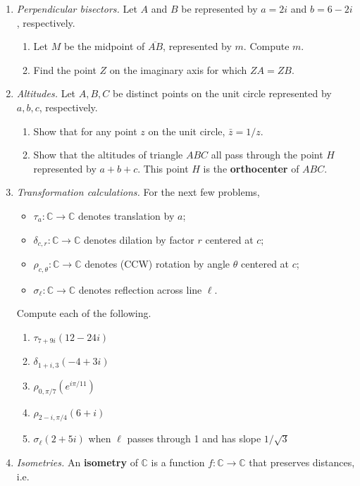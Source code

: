 \begin{enumerate}
\item \emph{Perpendicular bisectors.} Let $A$ and $B$ be represented by $a = 2i$ and $b = 6 - 2i$, respectively.
\begin{enumerate}
\item Let $M$ be the midpoint of $\overline{AB}$, represented by $m$. Compute $m$.
\item Find the point $Z$ on the imaginary axis for which $ZA = ZB$.
\end{enumerate}
\item \emph{Altitudes.} Let $A,B,C$ be distinct points on the unit circle represented by $a,b,c$, respectively.
\begin{enumerate}
\item Show that for any point $z$ on the unit circle, $\bar{z} = 1/z$.
\item Show that the altitudes of triangle $ABC$ all pass through the point $H$ represented by $a + b + c$. This point $H$ is the \textbf{orthocenter} of $ABC$.
\end{enumerate}
\item \emph{Transformation calculations.} For the next few problems,
\begin{itemize}
\item $\tau_a:\mathbb{C}\to\mathbb{C}$ denotes translation by $a$;
\item $\delta_{c,r}:\mathbb{C}\to\mathbb{C}$ denotes dilation by factor $r$ centered at $c$;
\item $\rho_{c,\theta}:\mathbb{C}\to\mathbb{C}$ denotes (CCW) rotation by angle $\theta$ centered at $c$;
\item $\sigma_{\ell}:\mathbb{C}\to\mathbb{C}$ denotes reflection across line $\ell$.
\end{itemize}
Compute each of the following.
\begin{enumerate}
\item $\tau_{7 + 9i}(12 - 24i)$
\item $\delta_{1 + i, 3}(-4 + 3i)$
\item $\rho_{0,\pi/7}(e^{i\pi/11})$
\item $\rho_{2 - i,\pi/4}(6 + i)$
\item $\sigma_{\ell}(2 + 5i)$ when $\ell$ passes through 1 and has slope $1/\sqrt{3}$
\end{enumerate}
\item \emph{Isometries.} An \textbf{isometry} of $\mathbb{C}$ is a function $f:\mathbb{C}\to\mathbb{C}$ that preserves distances, i.e. 
\begin{equation*}

\end{equation*}
\end{enumerate}
